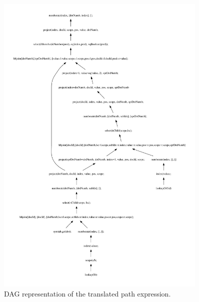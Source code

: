 \newpage
\begin{figure}[!htp]
\begin{center}
  \includegraphics[width=0.9\textwidth]{img/graphs/TD_patExprPred_dag}
  \caption{DAG representation of the translated path expression.}
  \label{fig:results:query_pathpred_result_dag}
\end{center}
\end{figure}

\newpage

